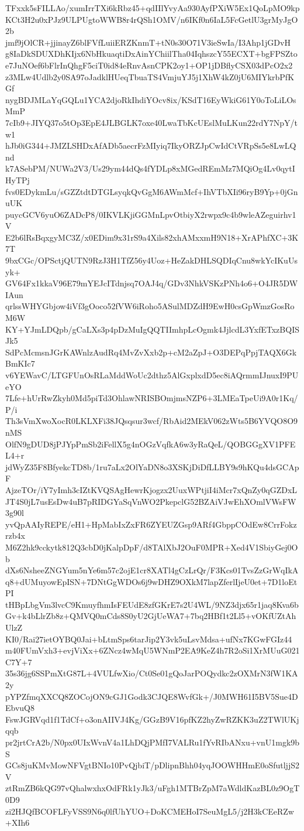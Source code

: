 TFxxk5sFILLAo/xumIrrTXi6kRbz45+qdIIlYvyAa930AyfPXiW5Ex1QoLpMO9kp
KCt3H2u0xPJz9ULPUgtoWWB8r4rQSh1OMV/n6IKf0n6IaL5FcGetlU3grMyJgO2b
jmf9jOlCR+jjinayZ6blFVfLuiiERZKnmT+tN0s30O71V3ieSwIa/I3Ahp1jGDvH
g8IaDkSDUXDhKIjx6NbHkuaqtiDxAinYChiilTha04IqhszcY55ECXT+bgFPSZto
e7JuNOef6bFlrInQhgF5ciT0id84eRnvAsnCPK2oy1+OP1jDBflyCSX03dPcO2x2
z3MLw4Udlb2y0SA97oJadklHUeqTbuaTS4VmjuYJ5j1XhW4kZ0jU6MIYkrbPfKGf
nygBDJMLaYqGQLu1YCA2djoRkIhdiYOcv8ix/KSdT16EyWkiG61Y0oToLiLOsMmP
7cIb9+JIYQ37o5tOp3EpE4JLBGLK7oxe40LwaTbKcUEslMuLKun22rdY7NpY/tw1
hJb0iG344+JMZLSHDxAfADb5aecrFzMIyiq7IkyORZJpCwIdCtVRpSs5e8LwLQnd
k7ASebPM/NUWa2V3/Us29ym44dQs4fYDLp8xMGedREmMz7MQiOg4Lv0qytIHyTPj
fvs0EDykmLu/sGZZtdtDTGLsyqkQvGgM6AWmMcf+IhVTbXIi96ryB9Yp+0jGnuUK
puycGCV6yuO6ZADcP8/0IKVLKjiGGMnLpvOtbiyX2rwpx9c4b9wleAZeguirhv1V
E2b6lRsBqxgyMC3Z/x0EDim9x31rS9a4Xils82xhAMxxmH9N18+XrAPhfXC+3K7T
9bxCGc/OPSctjQUTN9RzJ3H1TfZ56y4Uoz+HeZakDHLSQDIqCnu8wkYcIKuUsyk+
GV64Fx1kkaV96E79mYEJcITdnjsq7OAJ4q/GDv3NhkVSKzPNh4o6+O4JR5DWIAun
qrlssWHYGbjow4iVf3gOoco52fVW6iRoho5ASulMDZdH9EwH0csGpWmzGosRoM6W
KY+YJmLDQpb/gCaLXs3p4pDzMuIgQQTIImhpLcOgmk4JjlcdL3YxfETxzBQISJk5
SdPcMcmsnJGrKAWnlzAudRq4MvZvXxb2p+cM2aZpJ+O3DEPqPpjTAQX6GkBmKIc7
v6YEWavC/LTGFUnOsRLaMddWoUc2dthz5AlGxplxdD5ec8iAQrmmIJnuxI9PUeYO
7Lfe+hUrRwZkyh0Md5piTd3OhlawNRISBOmjmsNZP6+3LMEaTpeUi9A0r1Kq/P/i
Th3sVmXwoXocR0LKLXFi38JQsqsur3wcf/RbAid2MEkV062zWts5B6YVQO8O9nMS
OlfN9gDUD8jPJYpPmSb2iFellX5g4nOGzVqfkA6w3yRaQeL/QOBGGgXV1PFEL4+r
jdWyZ35F8BfyekcTD8b/1ru7aLx2OlYaDN8o3XSKjDiDfLLBY9s9hKQu4dsGCApF
AjzeTOr/iY7yImh3cIZtKVQSAgHewrKjogzx2UuxWPtjiI4iMcr7xQnZy0qGZDxL
JT4S0jL7usEsDw4uB7pRIDGYaSqVnWO2PkepclG52BZAiVJwEhXOmlVWsFW3g90l
yvQpAAIyREPE/eH1+HpMabIxZxFR6ZYEUZGsp9ARf4GbppCOdEw8CrrFokzrzb4x
M6Z2hk9cckytk812Q3cbD0jKalpDpF/d8TAlXbJ2OuF0MPR+Xed4V1SbiyGej0Ob
dXs6NsheeZNGYum5nYe6m57c2ojE1cr8XATl4gCzLrQr/F3Kcs01TvsZzGrWqIkA
q8+dUMuyowEpISN+7DNtGgWDOs6j9wDHZ9OXkM7lapZferlIjeU0et+7D1loEtPI
tHBpLbgVm3lvcC9KmuyfhmIsFEUdE8zfGKrE7s2U4WL/9NZ3djx65r1jaq8Kva6b
Gv+k4bLlrZb8z+QMVQ0mCds8S0yU2GjUeWA7+7bq2HBf1t2Ll5+vOKfUZtAhUlzZ
KI0/Rai27ietOYBQ0Jai+bLtmSps6tarJip2Y3vk5uLsvMdsa+ufNx7KGwFGIz44
m40FUmVxh3+evjViXx+6ZNcz4wMqU5WNmP2EA9KeZ4h7R2oSi1XrMUuG021C7Y+7
35s36jg6SSPmXtG87L+4VULfwXio/Ct0Se01gQoJarPOQydkc2zOXMrN3fW1KA2y
pYPZfmqXXCQ8ZOCojON9cGJ1Godk3CJQE8WvfGk+/J0MWH61I5BV5Sue4DEbvuQ8
FswJGRVqd1f1TdCf+o3onAIIVJ4Kg/GGzB9V16pfKZ2hyZwRZKK3uZ2TWlUKjqqb
pr2jrtCrA2b/N0px0UIxWvnV4a1LhDQjPMfI7VALRu1fYvRIbANxu+vnU1mgk9bS
GCs8juKMvMowNFVgtBNIo10PvQjbiT/pDlipnBhh04yqJOOWHHmE0oSfutljjS2V
ztRmZB6kQG97vQhalwxhxOdFRk1yJk3/uFgh1MTBrZpM7aWdldKazBL0z9OgT0D9
zi2HJQfBCOFLFyVSS9N6q0lfUhYUO+DoKCMEHoI7SeuMgL5/j2H3kCEeRZw+XIh6
